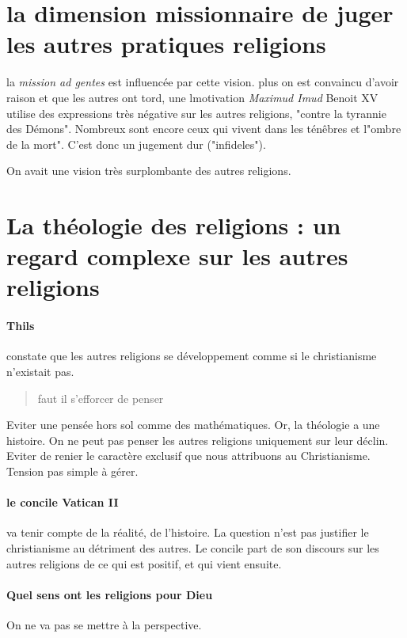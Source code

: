 \section{la dimension missionnaire de juger les autres pratiques religions}

la \textit{mission ad gentes} est influencée par cette vision. plus on est convaincu d'avoir raison et que les autres ont tord, une lmotivation
\textit{Maximud Imud}  Benoit XV utilise des expressions très négative sur les autres religions, "contre la tyrannie des Démons". Nombreux sont encore ceux qui vivent dans les ténêbres et l"ombre de la mort". C'est donc un jugement dur ("infideles"). 

\begin{Synthesis}
On avait une vision très surplombante des autres religions. 
\end{Synthesis}

\section{La théologie des religions : un regard complexe sur les autres religions}
\paragraph{Thils} constate que les autres religions se développement comme si le christianisme n'existait pas. 
\begin{quote}
     faut il s'efforcer de penser

\end{quote}

Eviter une pensée hors sol comme des mathématiques. Or, la théologie a une histoire. On ne peut pas penser les autres religions uniquement sur leur déclin.
Eviter de renier le caractère exclusif que nous attribuons au Christianisme. Tension pas simple à gérer.


\paragraph{le concile Vatican II} va tenir compte de la réalité, de l'histoire. La question n'est pas justifier le christianisme au détriment des autres. Le concile part de son discours sur les autres religions de ce qui est positif, et qui vient ensuite.

\paragraph{Quel sens ont les religions pour Dieu} On ne va pas se mettre à la perspective.

